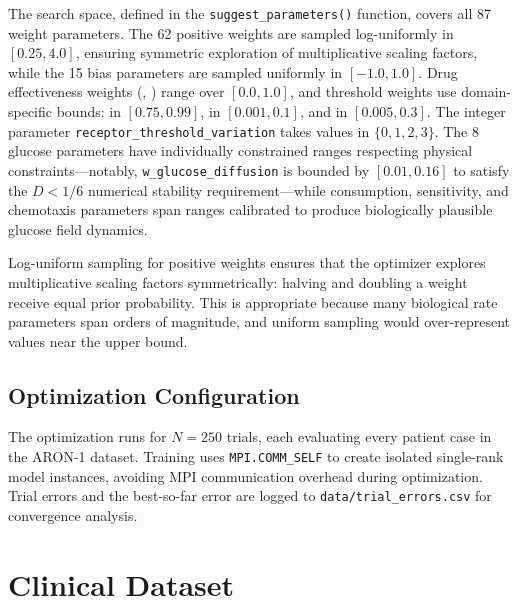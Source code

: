 The search space, defined in the \texttt{suggest\_parameters()} function, covers all 87 weight parameters. The 62 positive weights are sampled log-uniformly in $[0.25, 4.0]$, ensuring symmetric exploration of multiplicative scaling factors, while the 15 bias parameters are sampled uniformly in $[-1.0, 1.0]$. Drug effectiveness weights (, ) range over $[0.0, 1.0]$, and threshold weights use domain-specific bounds:  in $[0.75, 0.99]$,  in $[0.001, 0.1]$, and  in $[0.005, 0.3]$. The integer parameter \texttt{receptor\_threshold\_variation} takes values in $\{0, 1, 2, 3\}$. The 8 glucose parameters have individually constrained ranges respecting physical constraints---notably, \texttt{w\_glucose\_diffusion} is bounded by $[0.01, 0.16]$ to satisfy the $D < 1/6$ numerical stability requirement---while consumption, sensitivity, and chemotaxis parameters span ranges calibrated to produce biologically plausible glucose field dynamics.

\begin{keyinsight}
Log-uniform sampling for positive weights ensures that the optimizer explores multiplicative scaling factors symmetrically: halving and doubling a weight receive equal prior probability.  This is appropriate because many biological rate parameters span orders of magnitude, and uniform sampling would over-represent values near the upper bound.
\end{keyinsight}

\subsection{Optimization Configuration}

The optimization runs for $N = 250$ trials, each evaluating every patient case in the ARON-1 dataset. Training uses \texttt{MPI.COMM\_SELF} to create isolated single-rank model instances, avoiding MPI communication overhead during optimization. Trial errors and the best-so-far error are logged to \texttt{data/trial\_errors.csv} for convergence analysis.


\section{Clinical Dataset}
\label{sec:clinical-dataset}

